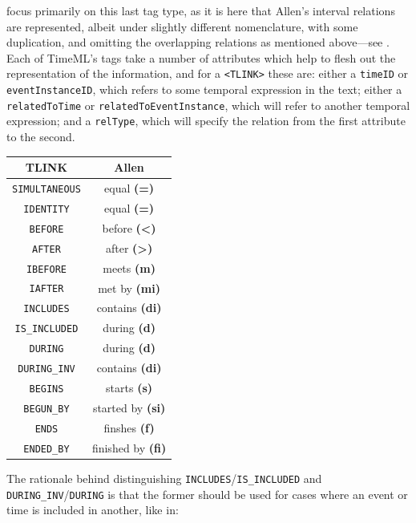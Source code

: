 \documentclass[a4paper,12pt,leqno,twoside]{article}
\begin{document}
 focus primarily on this last tag type, as it is here that Allen's interval relations are represented, albeit under slightly different nomenclature, with some duplication, and omitting the overlapping relations as mentioned above---see . Each of TimeML's tags take a number of attributes which help to flesh out the representation of the information, and for a \verb|<TLINK>| these are: either a \texttt{timeID} or \texttt{event\allowbreak{}InstanceID}, which refers to some temporal expression in the text; either a \texttt{relatedTo\allowbreak{}Time} or \texttt{relatedTo\allowbreak{}Event\allowbreak{}Instance}, which will refer to another temporal expression; and a \texttt{relType}, which will specify the relation from the first attribute to the second.
\begin{center}
	\begin{tabular}[h!]{|c c|}
		\hline
		\textbf{TLINK} & \textbf{Allen}\\
		\hline
		\texttt{SIMULTANEOUS} & equal \textbf{(=)}\\
		\texttt{IDENTITY} & equal \textbf{(=)}\\
		\texttt{BEFORE} & before \textbf{(\textless{})}\\
		\texttt{AFTER} & after \textbf{(\textgreater{})}\\
		\texttt{IBEFORE} & meets \textbf{(m)}\\
		\texttt{IAFTER} & met by \textbf{(mi)}\\
		\texttt{INCLUDES} & contains \textbf{(di)}\\
		\texttt{IS\_INCLUDED} & during \textbf{(d)}\\
		\texttt{DURING} & during \textbf{(d)}\\
		\texttt{DURING\_INV} & contains \textbf{(di)}\\
		\texttt{BEGINS} & starts \textbf{(s)}\\
		\texttt{BEGUN\_BY} & started by \textbf{(si)}\\
		\texttt{ENDS} & finshes \textbf{(f)}\\
		\texttt{ENDED\_BY} & finished by \textbf{(fi)}\\
		\hline
	\end{tabular}
	\label{fig:tlink-allen-translation}
\end{center}
The rationale behind distinguishing \texttt{INCLUDES}/\texttt{IS\_INCLUDED} and \texttt{DURING\_INV}/\texttt{DURING} is that the former should be used for cases where an event or time is included in another, like in:
\end{document}
